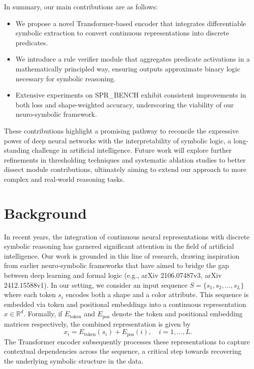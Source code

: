 \documentclass{article}
\begin{document}
In summary, our main contributions are as follows:
\begin{itemize}
    \item We propose a novel Transformer-based encoder that integrates differentiable symbolic extraction to convert continuous representations into discrete predicates.
    \item We introduce a rule verifier module that aggregates predicate activations in a mathematically principled way, ensuring outputs approximate binary logic necessary for symbolic reasoning.
    \item Extensive experiments on SPR\_BENCH exhibit consistent improvements in both loss and shape-weighted accuracy, underscoring the viability of our neuro-symbolic framework.
\end{itemize}

These contributions highlight a promising pathway to reconcile the expressive power of deep neural networks with the interpretability of symbolic logic, a long-standing challenge in artificial intelligence. Future work will explore further refinements in thresholding techniques and systematic ablation studies to better dissect module contributions, ultimately aiming to extend our approach to more complex and real-world reasoning tasks.

\section{Background}
In recent years, the integration of continuous neural representations with discrete symbolic reasoning has garnered significant attention in the field of artificial intelligence. Our work is grounded in this line of research, drawing inspiration from earlier neuro‐symbolic frameworks that have aimed to bridge the gap between deep learning and formal logic (e.g., arXiv 2106.07487v3, arXiv 2412.15588v1). In our setting, we consider an input sequence \( S = \{s_1, s_2, \ldots, s_L\} \) where each token \( s_i \) encodes both a shape and a color attribute. This sequence is embedded via token and positional embeddings into a continuous representation \( x \in \mathbb{R}^d \). Formally, if \( E_\text{token} \) and \( E_\text{pos} \) denote the token and positional embedding matrices respectively, the combined representation is given by
\[
x_i = E_\text{token}(s_i) + E_\text{pos}(i), \quad i = 1, \ldots, L.
\]
The Transformer encoder subsequently processes these representations to capture contextual dependencies across the sequence, a critical step towards recovering the underlying symbolic structure in the data.
\end{document}
